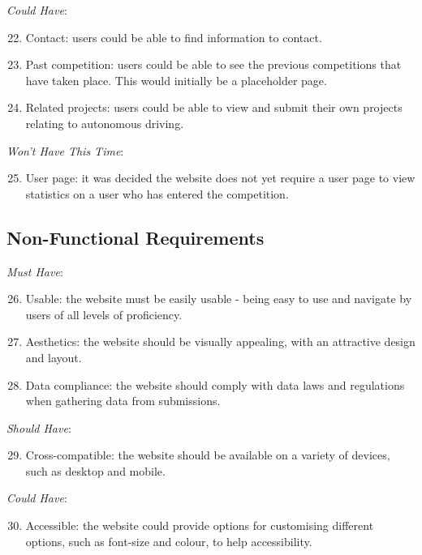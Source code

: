 \documentclass{l4proj}
\begin{document}
\textit{Could Have}:
\begin{enumerate}[label=\arabic{chapter}.\arabic*]
\setcounter{enumi}{21}
    \item Contact: users could be able to find information to contact.
    \item Past competition: users could be able to see the previous competitions that have taken place. This would initially be a placeholder page.
    \item Related projects: users could be able to view and submit their own projects relating to autonomous driving.
\end{enumerate}

\textit{Won't Have This Time}:
\begin{enumerate}[label=\arabic{chapter}.\arabic*]
\setcounter{enumi}{24}
    \item User page: it was decided the website does not yet require a user page to view statistics on a user who has entered the competition.
\end{enumerate}

\subsection{Non-Functional Requirements}
\textit{Must Have}:
\begin{enumerate}[label=\arabic{chapter}.\arabic*]
\setcounter{enumi}{25}
    \item Usable: the website must be easily usable - being easy to use and navigate by users of all levels of proficiency.
    \item Aesthetics: the website should be visually appealing, with an attractive design and layout.
    \item Data compliance: the website should comply with data laws and regulations when gathering data from submissions.
\end{enumerate}

\textit{Should Have}:
\begin{enumerate}[label=\arabic{chapter}.\arabic*]
\setcounter{enumi}{28}
    \item Cross-compatible: the website should be available on a variety of devices, such as desktop and mobile.
\end{enumerate}

\textit{Could Have}:
\begin{enumerate}[label=\arabic{chapter}.\arabic*]
\setcounter{enumi}{29}
    \item Accessible: the website could provide options for customising different options, such as font-size and colour, to help accessibility.
\end{enumerate}
\end{document}
